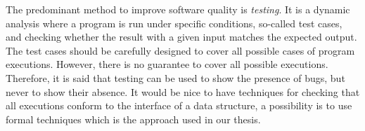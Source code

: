 

The predominant method to improve software quality is
\emph{testing}. It is a dynamic analysis where a program is run under specific conditions, so-called test cases, and checking whether the result with a given input matches the expected output.
%
The test cases should be carefully designed to cover all possible cases of program executions.
%
However, there is no guarantee to cover all possible executions. Therefore, it is said that
testing can be used to show the presence of bugs, but never to show their absence. 
It would be nice to have techniques for checking that all executions conform to the interface of a data structure, a possibility is to use formal techniques which is the approach used in our thesis.

%


